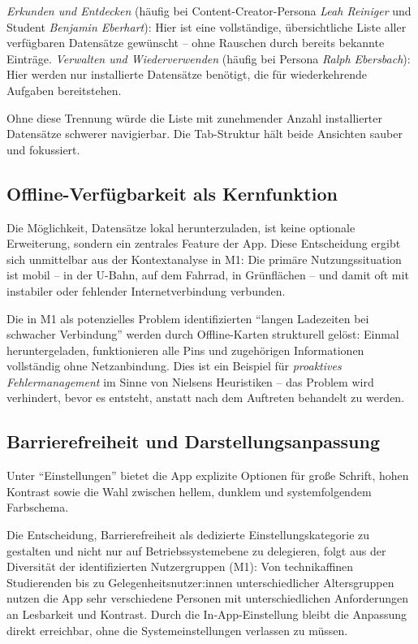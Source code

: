 \textit{Erkunden und Entdecken} (häufig bei Content-Creator-Persona \textit{Leah Reiniger} und Student \textit{Benjamin Eberhart}):
Hier ist eine vollständige, übersichtliche Liste aller verfügbaren Datensätze gewünscht -- ohne Rauschen durch bereits bekannte Einträge.
\textit{Verwalten und Wiederverwenden} (häufig bei Persona \textit{Ralph Ebersbach}):
Hier werden nur installierte Datensätze benötigt, die für wiederkehrende Aufgaben bereitstehen.

Ohne diese Trennung würde die Liste mit zunehmender Anzahl installierter Datensätze schwerer navigierbar.
Die Tab-Struktur hält beide Ansichten sauber und fokussiert.

\subsection{Offline-Verfügbarkeit als Kernfunktion}

Die Möglichkeit, Datensätze lokal herunterzuladen, ist keine optionale Erweiterung, sondern ein zentrales Feature der App.
Diese Entscheidung ergibt sich unmittelbar aus der Kontextanalyse in M1:
Die primäre Nutzungssituation ist mobil -- in der U-Bahn, auf dem Fahrrad, in Grünflächen -- und damit oft mit
instabiler oder fehlender Internetverbindung verbunden.

Die in M1 als potenzielles Problem identifizierten \enquote{langen Ladezeiten bei schwacher Verbindung}
werden durch Offline-Karten strukturell gelöst: Einmal heruntergeladen, funktionieren alle Pins und zugehörigen
Informationen vollständig ohne Netzanbindung.
Dies ist ein Beispiel für \textit{proaktives Fehlermanagement} im Sinne von Nielsens Heuristiken --
das Problem wird verhindert, bevor es entsteht, anstatt nach dem Auftreten behandelt zu werden.

\subsection{Barrierefreiheit und Darstellungsanpassung}

Unter \enquote{Einstellungen} bietet die App explizite Optionen für große Schrift, hohen Kontrast sowie
die Wahl zwischen hellem, dunklem und systemfolgendem Farbschema.

Die Entscheidung, Barrierefreiheit als dedizierte Einstellungskategorie zu gestalten und nicht nur auf
Betriebssystemebene zu delegieren, folgt aus der Diversität der identifizierten Nutzergruppen (M1):
Von technikaffinen Studierenden bis zu Gelegenheitsnutzer:innen unterschiedlicher Altersgruppen
nutzen die App sehr verschiedene Personen mit unterschiedlichen Anforderungen an Lesbarkeit und Kontrast.
Durch die In-App-Einstellung bleibt die Anpassung direkt erreichbar, ohne die Systemeinstellungen verlassen zu müssen.
